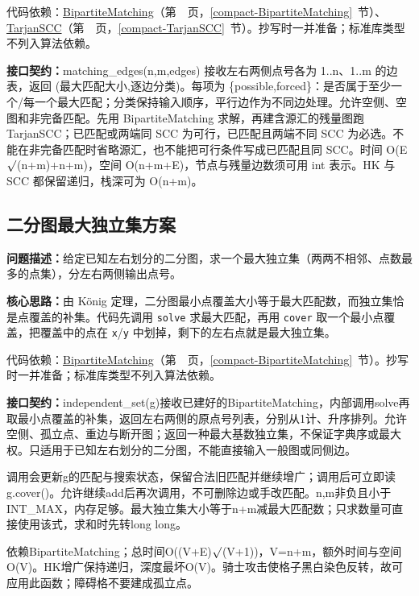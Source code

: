 代码依赖：\hyperref[compact-BipartiteMatching]{BipartiteMatching}（第~\pageref{compact-BipartiteMatching}~页，\ref{compact-BipartiteMatching}~节）、\hyperref[compact-TarjanSCC]{TarjanSCC}（第~\pageref{compact-TarjanSCC}~页，\ref{compact-TarjanSCC}~节）。抄写时一并准备；标准库类型不列入算法依赖。

{\sloppy{}\noindent\textbf{接口契约：}matching\_edges(n,m,edges) 接收左右两侧点号各为 1..n、1..m 的边表，返回 (最大匹配大小,逐边分类)。每项为 \{possible,forced\}：是否属于至少一个/每一个最大匹配；分类保持输入顺序，平行边作为不同边处理。允许空侧、空图和非完备匹配。先用 BipartiteMatching 求解，再建含源汇的残量图跑 TarjanSCC；已匹配或两端同 SCC 为可行，已匹配且两端不同 SCC 为必选。不能在非完备匹配时省略源汇，也不能把可行条件写成已匹配且同 SCC。时间 O(E$\sqrt{\vphantom x}$(n+m)+n+m)，空间 O(n+m+E)，节点与残量边数须可用 int 表示。HK 与 SCC 都保留递归，栈深可为 O(n+m)。\par}



\Needspace{406pt}

\subsection{二分图最大独立集方案}\label{compact-independent_set}

\noindent\textbf{问题描述：}\allowbreak 给定已知左右划分的二分图，求一个最大独立集（两两不相邻、点数最多的点集），分左右两侧输出点号。

\textbf{核心思路：}\allowbreak 由 König 定理，二分图最小点覆盖大小等于最大匹配数，而独立集恰是点覆盖的补集。代码先调用 \texttt{solve} 求最大匹配，再用 \texttt{cover} 取一个最小点覆盖，把覆盖中的点在 \texttt{x}/\texttt{y} 中划掉，剩下的左右点就是最大独立集。

代码依赖：\hyperref[compact-BipartiteMatching]{BipartiteMatching}（第~\pageref{compact-BipartiteMatching}~页，\ref{compact-BipartiteMatching}~节）。抄写时一并准备；标准库类型不列入算法依赖。

{\sloppy{}\noindent\textbf{接口契约：}independent\_set(g)接收已建好的BipartiteMatching，内部调用solve再取最小点覆盖的补集，返回左右两侧的原点号列表，分别从1计、升序排列。允许空侧、孤立点、重边与断开图；返回一种最大基数独立集，不保证字典序或最大权。只适用于已知左右划分的二分图，不能直接输入一般图或同侧边。

调用会更新g的匹配与搜索状态，保留合法旧匹配并继续增广；调用后可立即读g.cover()。允许继续add后再次调用，不可删除边或手改匹配。n,m非负且小于INT\_MAX，内存足够。最大独立集大小等于n+m减最大匹配数；只求数量可直接使用该式，求和时先转long long。

依赖BipartiteMatching；总时间O((V+E)$\sqrt{\vphantom x}$(V+1))，V=n+m，额外时间与空间O(V)。HK增广保持递归，深度最坏O(V)。骑士攻击使格子黑白染色反转，故可应用此函数；障碍格不要建成孤立点。\par}

